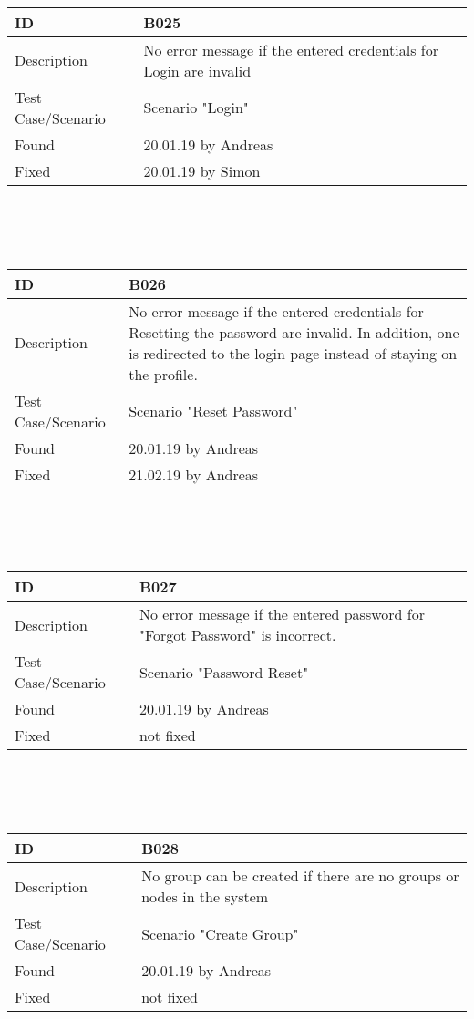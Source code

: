 \documentclass{scrreprt}
\begin{document}
\\ \\ \\
\begin{tabularx}{12cm}{l|X}
ID					& B025  \\
\hline
Description 		& 
No error message if the entered credentials for Login are invalid\\
\hline
Test Case/Scenario	& Scenario "Login"  \\
\hline
Found				& 20.01.19 by Andreas  \\
\hline
Fixed				& 20.01.19 by Simon \\ 
\end{tabularx}
\\ \\ \\
\begin{tabularx}{12cm}{l|X}
ID					& B026  \\
\hline
Description 		& 
No error message if the entered credentials for Resetting the password are invalid.  In addition, one is redirected to the login page instead of staying on the profile.\\
\hline
Test Case/Scenario	& Scenario "Reset Password"  \\
\hline
Found				& 20.01.19 by Andreas  \\
\hline
Fixed				& 21.02.19 by Andreas\\ 
\end{tabularx}
\\ \\ \\
\begin{tabularx}{12cm}{l|X}
ID					& B027  \\
\hline
Description 		& 
No error message if the entered password for "Forgot Password" is incorrect.\\
\hline
Test Case/Scenario	& Scenario "Password Reset"  \\
\hline
Found				& 20.01.19 by Andreas  \\
\hline
Fixed				& not fixed\\ 
\end{tabularx}
\\ \\ \\
\begin{tabularx}{12cm}{l|X}
ID					& B028  \\
\hline
Description 		& 
No group can be created if there are no groups or nodes in the system\\
\hline
Test Case/Scenario	& Scenario "Create Group"  \\
\hline
Found				& 20.01.19 by Andreas  \\
\hline
Fixed				& not fixed\\ 
\end{tabularx}
\end{document}
